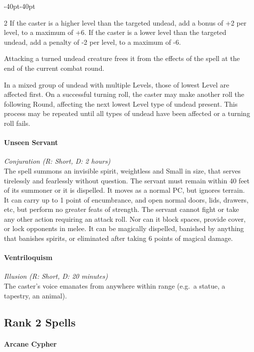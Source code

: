 \documentclass{book}
\begin{document}
\begin{adjustwidth}{-40pt}{-40pt}
\begin{multicols}{2}
If the caster is a higher level than the targeted undead, add a bonus of
+2 per level, to a maximum of +6. If the caster is a lower level than
the targeted undead, add a penalty of -2 per level, to a maximum of -6.

Attacking a turned undead creature frees it from the effects of the
spell at the end of the current combat round.

In a mixed group of undead with multiple Levels, those of lowest Level
are affected first. On a successful turning roll, the caster may make
another roll the following Round, affecting the next lowest Level type
of undead present. This process may be repeated until all types of
undead have been affected or a turning roll fails.

\paragraph{Unseen Servant}\label{unseen-servant}

\emph{Conjuration (R: Short, D: 2 hours)}\\
The spell summons an invisible spirit, weightless and Small in size,
that serves tirelessly and fearlessly without question. The servant must
remain within 40 feet of its summoner or it is dispelled. It moves as a
normal PC, but ignores terrain. It can carry up to 1 point of
encumbrance, and open normal doors, lids, drawers, etc, but perform no
greater feats of strength. The servant cannot fight or take any other
action requiring an attack roll. Nor can it block spaces, provide cover,
or lock opponents in melee. It can be magically dispelled, banished by
anything that banishes spirits, or eliminated after taking 6 points of
magical damage.

\paragraph{Ventriloquism}\label{ventriloquism}

\emph{Illusion (R: Short, D: 20 minutes)}\\
The caster's voice emanates from anywhere within range (e.g.~a statue, a
tapestry, an animal).

\subsection*{Rank 2 Spells}\label{rank-2-spells}

\paragraph{Arcane Cypher}\label{arcane-cypher}


\end{multicols}
\end{adjustwidth}
\end{document}
